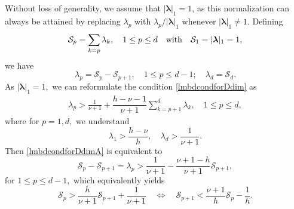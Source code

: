 \documentclass[10pt,reqno,final]{amsart}
\theoremstyle{remark}
\theoremstyle{definition}
\newcommand{\bs}[1]{\boldsymbol{#1}}
\begin{document}
Without loss of generality, we assume that $|\bs \lambda|_1 = 1$, as this normalization can always be attained by replacing $\lambda_p$ with $\lambda_p / |\bs \lambda|_1$ whenever $|\bs \lambda|_1 \ne 1$. 
Defining
\begin{equation}\label{SpQp}
  {\mathcal S}_p=\sum_{k=p}\lambda_k,\quad 1\le p\le d \quad{\rm with}\quad {\mathcal S}_1=|\bs \lambda|_1=1,  
\end{equation}
we have
\begin{equation}\label{lmdpS-A}
    \lambda_p={\mathcal S}_p-{\mathcal S}_{p+1},\quad 1\le p\le d-1;\quad \lambda_d={\mathcal S}_d.
\end{equation}
As $|\bs \lambda|_1=1,$ we can reformulate the condition \eqref{lmbdcondforDdim} as 
\begin{equation}\label{lmbdcondforDdimA}
\begin{split} 
\lambda_p >\frac 1{\nu+1} + 
\dfrac{h-\nu-1}{\nu+1} \sum_{k=p+1}^d\lambda_k,\quad  1\le p\le d,   
\end{split}
\end{equation}  
where  for $p=1,d,$ we understand 
\begin{equation}\label{lmbd1D}
\lambda_1 >\frac {h-\nu} h,\quad \lambda_d >\frac 1{\nu+1}.
\end{equation}
Then  \eqref{lmbdcondforDdimA} is equivalent to 
\begin{equation}\label{lambdapS}
{\mathcal S}_{p}-{\mathcal S}_{p+1}=\lambda_p>\frac{1}{\nu+1}-\frac{\nu+1-h}{\nu+1}{\mathcal S}_{p+1},
\end{equation}
for $1 \le p\le d-1,$ which equivalently yields 
\begin{equation}\label{Sp-recurr}
{\mathcal S}_p>\frac{h}{\nu+1}{\mathcal S}_{p+1}+\frac{1}{\nu+1} \quad \Leftrightarrow  \quad {\mathcal S}_{p+1}<\frac{\nu+1}{h}{\mathcal S}_p-\frac{1}{h}.
\end{equation}
\end{document}
